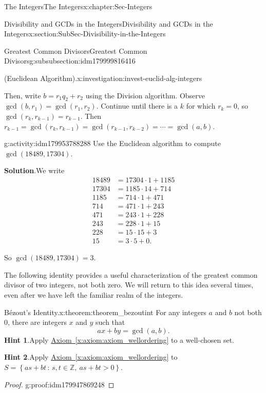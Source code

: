\documentclass[oneside,10pt,]{book}
\newcommand{\blocktitlefont}{\relax}
\newcommand{\xreffont}{\relax}
\numberwithin{equation}{section}
\newcommand{\setof}[2]{{\left\{#1\,\colon\,#2\right\}}}
\def\Z{{\mathbb Z}}
\newcommand{\gt}{>}
\newcommand{\amp}{&}
\begin{document}
\begin{chapterptx}{The Integers}{}{The Integers}{}{}{x:chapter:Sec-Integers}
\begin{sectionptx}{Divisibility and GCDs in the Integers}{}{Divisibility and GCDs in the Integers}{}{}{x:section:SubSec-Divisibility-in-the-Integers}
\begin{subsubsectionptx}{Greatest Common Divisors}{}{Greatest Common Divisors}{}{}{g:subsubsection:idm179999816416}
\begin{investigation}{(Euclidean Algorithm).}{x:investigation:invest-euclid-alg-integers}
\par
Then, write \(b = r_1 q_2 + r_2\) using the Division algorithm. Observe \(\gcd(b,r_1) = \gcd(r_1,r_2)\). Continue until there is a \(k\) for which \(r_k = 0\), so \(\gcd(r_k,r_{k-1}) = r_{k-1}\). Then \(r_{k-1}= \gcd(r_k, r_{k-1}) = \gcd(r_{k-1},r_{k-2}) = \cdots = \gcd(a,b)\).%
\end{investigation}
\begin{activity}{}{g:activity:idm179953788288}%
Use the Euclidean algorithm to compute \(\gcd(18489,17304)\).%
\par\smallskip%
\noindent\textbf{\blocktitlefont Solution}.\hypertarget{g:solution:idm179947541680}{}\quad{}We write%
\begin{align*}
18489 \amp = 17304 \cdot 1 +1185\\
17304 \amp = 1185\cdot 14 +714\\
1185 \amp = 714 \cdot 1 + 471\\
714 \amp = 471 \cdot 1+ 243\\
471 \amp = 243\cdot 1 + 228\\
243 \amp = 228 \cdot 1+ 15\\
228 \amp = 15 \cdot 15 + 3\\
15 \amp = 3\cdot 5 + 0\text{.}
\end{align*}
%
\par
So \(\gcd(18489,17304)=3\).%
\end{activity}
The following identity provides a useful characterization of the greatest common divisor of two integers, not both zero. We will return to this idea several times, even after we have left the familiar realm of the integers.%
\begin{theorem}{Bézout's Identity.}{}{x:theorem:theorem_bezoutint}%
%
For any integers \(a\) and \(b\) not both 0, there are integers \(x\) and \(y\) such that%
\begin{equation*}
ax + by = \gcd(a,b)\text{.}
\end{equation*}
%
\textbf{\blocktitlefont Hint 1}.\quad{}Apply \hyperref[x:axiom:axiom_wellordering]{Axiom~{\xreffont\ref{x:axiom:axiom_wellordering}}} to a well-chosen set.%
\par\smallskip%
\noindent\textbf{\blocktitlefont Hint 2}.\quad{}Apply \hyperref[x:axiom:axiom_wellordering]{Axiom~{\xreffont\ref{x:axiom:axiom_wellordering}}} to \(S = \setof{as+bt}{s,t\in\Z, \ as+bt \gt 0}\).%
\end{theorem}
\begin{proof}{}{g:proof:idm179947869248}

\end{proof}
\end{subsubsectionptx}
\end{sectionptx}
\end{chapterptx}
\end{document}
